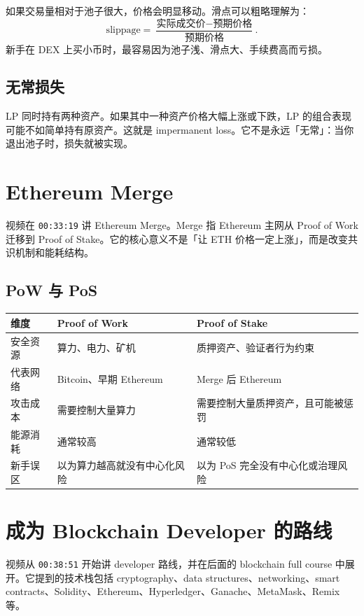 \documentclass[UTF8,11pt]{ctexart}
\newcommand{\timestamp}[1]{\textcolor{blue!50!black}{\texttt{#1}}}
\begin{document}
如果交易量相对于池子很大，价格会明显移动。滑点可以粗略理解为：
\[
\text{slippage}=\frac{\text{实际成交价}-\text{预期价格}}{\text{预期价格}}.
\]
新手在 DEX 上买小币时，最容易因为池子浅、滑点大、手续费高而亏损。

\subsection{无常损失}

LP 同时持有两种资产。如果其中一种资产价格大幅上涨或下跌，LP 的组合表现可能不如简单持有原资产。这就是 impermanent loss。它不是永远「无常」：当你退出池子时，损失就被实现。

\section{Ethereum Merge}

视频在 \timestamp{00:33:19} 讲 Ethereum Merge。Merge 指 Ethereum 主网从 Proof of Work 迁移到 Proof of Stake。它的核心意义不是「让 ETH 价格一定上涨」，而是改变共识机制和能耗结构。

\subsection{PoW 与 PoS}

\begin{longtable}{>{\raggedright\arraybackslash}p{3.6cm}>{\raggedright\arraybackslash}p{5.6cm}>{\raggedright\arraybackslash}p{5.6cm}}
\toprule
\textbf{维度} & \textbf{Proof of Work} & \textbf{Proof of Stake} \\
\midrule
\endhead
安全资源 & 算力、电力、矿机 & 质押资产、验证者行为约束 \\
代表网络 & Bitcoin、早期 Ethereum & Merge 后 Ethereum \\
攻击成本 & 需要控制大量算力 & 需要控制大量质押资产，且可能被惩罚 \\
能源消耗 & 通常较高 & 通常较低 \\
新手误区 & 以为算力越高就没有中心化风险 & 以为 PoS 完全没有中心化或治理风险 \\
\bottomrule
\end{longtable}

\section{成为 Blockchain Developer 的路线}
\label{sec:developer}

视频从 \timestamp{00:38:51} 开始讲 developer 路线，并在后面的 blockchain full course 中展开。它提到的技术栈包括 cryptography、data structures、networking、smart contracts、Solidity、Ethereum、Hyperledger、Ganache、MetaMask、Remix 等。
\end{document}
